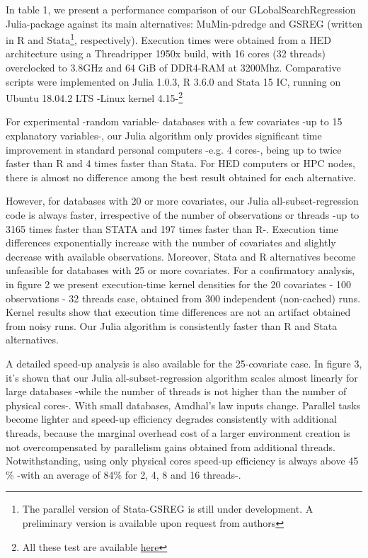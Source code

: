 \documentclass{juliacon}
\begin{document}
In table 1, we present a performance comparison of our GLobalSearchRegression Julia-package against its main alternatives: MuMin-pdredge and GSREG (written in R and Stata\footnote{The parallel version of Stata-GSREG is still under development. A preliminary version is available upon request from authors}, respectively).
Execution times were obtained from a HED architecture using a Threadripper 1950x build, with 16 cores (32 threads) overclocked to 3.8GHz and 64 GiB of DDR4-RAM at 3200Mhz. Comparative scripts were implemented on Julia 1.0.3, R 3.6.0 and Stata 15 IC, running on Ubuntu 18.04.2 LTS -Linux kernel 4.15-\footnote{All these test are available \href{https://github.com/ParallelGSReg/GlobalSearchRegression.jl/tree/master/juliacon2019proceedings/reproducibility}{here}} \vskip 6pt

For experimental -random variable- databases with a few covariates -up to 15 explanatory variables-, our Julia algorithm only provides significant time improvement in standard personal computers -e.g. 4 cores-, being up to twice faster than R and 4 times faster than Stata. For HED computers or HPC nodes, there is almost no difference among the best result obtained for each alternative. \vskip 6pt


However, for databases with 20 or more covariates, our Julia all-subset-regression code is always faster, irrespective of the number of observations or threads -up to 3165 times faster than STATA and 197 times faster than R-. Execution time differences exponentially increase with the number of covariates and slightly decrease with available observations. Moreover, Stata and R alternatives become unfeasible for databases with 25 or more covariates. For a confirmatory analysis, in figure 2 we present execution-time kernel densities for the 20 covariates - 100 observations - 32 threads case, obtained from 300 independent (non-cached) runs. Kernel results show that execution time differences are not an artifact obtained from noisy runs. Our Julia algorithm is consistently faster than R and Stata alternatives. \vskip 6pt

A detailed speed-up analysis is also available for the 25-covariate case. In figure 3, it's shown that our Julia all-subset-regression algorithm scales almost linearly for large databases -while the number of threads is not higher than the number of physical cores-. With small databases, Amdhal's law inputs change. Parallel tasks become lighter and speed-up efficiency degrades consistently with additional threads, because the marginal overhead cost of a larger environment creation is not overcompensated by parallelism gains obtained from additional threads. Notwithstanding, using only physical cores speed-up efficiency is always above 45 \%  -with an average of 84\% for 2, 4, 8 and 16 threads-. 
\end{document}
